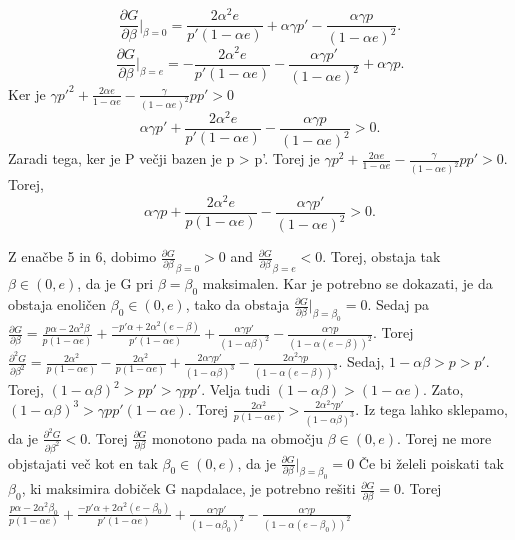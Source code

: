 \documentclass[12pt]{article}
\begin{document}
\begin{equation}
\frac{\partial G}{\partial \beta} |_{\beta=0} = \frac{2\alpha^2 e}{p' (1 - \alpha e)} + \alpha\gamma p' - \frac{\alpha\gamma p }{(1 - \alpha e)^2}.
\end{equation}
\begin{equation}
\frac{\partial G}{\partial \beta} |_{\beta=e} = -\frac{2\alpha^2 e}{p' (1 - \alpha e)}- \frac{\alpha\gamma p' }{(1 - \alpha e)^2} + \alpha\gamma p.
\end{equation}
Ker je $\gamma p'^2 + \frac{2\alpha e}{1 - \alpha e} - \frac{\gamma}{(1 - \alpha e) ^ 2} p p' > 0$
\begin{equation}
\alpha\gamma p' + \frac{2\alpha^2 e}{p'(1 - \alpha e)} - \frac{\alpha\gamma p}{(1 - \alpha e)^2} > 0.
\end{equation}
Zaradi tega, ker je P večji bazen je p > p'. Torej je $\gamma p^2 + \frac{2\alpha e}{1 - \alpha e} - \frac{\gamma}{(1 - \alpha e)^2} p p' > 0$. Torej,
\begin{equation}
\alpha\gamma p + \frac{2\alpha^2 e}{p(1 - \alpha e)} - \frac{\alpha\gamma p'}{(1- \alpha e)^2} > 0.
\end{equation}

Z enačbe 5 in 6, dobimo $\frac{\partial G}{\partial \beta}_{\beta=0} > 0$ and $\frac{\partial G} {\partial \beta}_{\beta=e} < 0$. Torej, obstaja tak $\beta \in (0, e)$, da je G pri $\beta=\beta_0$ maksimalen. Kar je potrebno se dokazati, je da obstaja enoličen $\beta_0 \in (0,e)$, tako da obstaja $\frac{\partial G}{\partial \beta}|_{\beta=\beta_0} = 0$. Sedaj pa $\frac{\partial G}{\partial \beta} = \frac{p\alpha - 2\alpha^2 \beta}{p(1 - \alpha e)} + \frac{-p' \alpha + 2 \alpha^2(e - \beta)}{p' (1 - \alpha e)} + \frac{\alpha\gamma p'}{(1 - \alpha\beta)^2} - \frac{\alpha\gamma p}{(1 - \alpha(e- \beta))^2}$. Torej $\frac{\partial^2 G}{\partial \beta^2} = \frac{2\alpha^2}{p(1 - \alpha e)} - \frac{2 \alpha^2}{p(1 - \alpha e)} + \frac{2\alpha\gamma p'}{(1 - \alpha\beta)^3} - \frac{2\alpha^2 \gamma p}{(1 - \alpha(e - \beta))^3}$. Sedaj, $1 - \alpha\beta > p > p'$. Torej, $(1 - \alpha\beta)^2 > pp' > \gamma p p'$. Velja tudi $(1- \alpha\beta) > (1- \alpha e)$. Zato, $(1- \alpha\beta)^3 > \gamma p p'(1- \alpha e)$. Torej $\frac{2\alpha^2}{p(1 - \alpha e)} > \frac{2\alpha^2 \gamma p'}{(1 - \alpha\beta)^3}$. Iz tega lahko sklepamo, da je $\frac{\partial^2 G}{\partial \beta^2} < 0$. Torej $\frac{\partial G}{\partial \beta}$ monotono pada na območju $\beta \in (0, e)$. Torej ne more objstajati več kot en tak $\beta_0 \in (0, e)$, da je $\frac{\partial G}{\partial \beta}|_{\beta=\beta_0} = 0$
\newline
\newline
Če bi želeli poiskati tak $\beta_0$, ki maksimira dobiček G napdalace, je potrebno rešiti $\frac{\partial G}{\partial \beta} = 0$. Torej $\frac{p \alpha - 2\alpha^2 \beta_0}{p(1 - \alpha e)} + \frac{-p'\alpha + 2\alpha^2(e - \beta_0)}{p'(1- \alpha e)} + \frac{\alpha\gamma p'}{(1 - \alpha\beta_0)^2} - \frac{\alpha\gamma p}{(1- \alpha(e - \beta_0))^2}$
\end{document}
